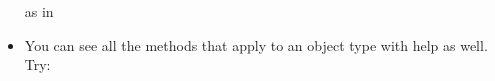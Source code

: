 \documentclass[letterpaper,10pt,english]{sphinxmanual}
\begin{document}
\begin{itemize}
as in

%
\begin{sphinxVerbatim}[commandchars=\\\{\}]
 
\end{sphinxVerbatim}

\item {} 
You can see all the methods that apply to an object type with help
as well. Try:

%
\begin{sphinxVerbatim}[commandchars=\\\{\}]
\end{sphinxVerbatim}

\end{itemize}
\end{document}
